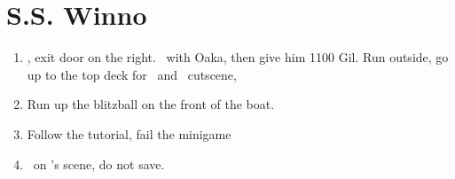 \chapter{S.S. Winno}
\begin{enumerate}
	\item \cs[1:10], exit door on the right. \sd\ with Oaka, then give him 1100 Gil. Run outside, go up to the top deck for \wakka\ and \lulu\ cutscene, \sd
	\item Run up the blitzball on the front of the boat. \cs[1:10]
	\item Follow the tutorial, fail the minigame
	\item \sd\ on \yuna's scene, do not save. \fmv[0:30]
\end{enumerate}